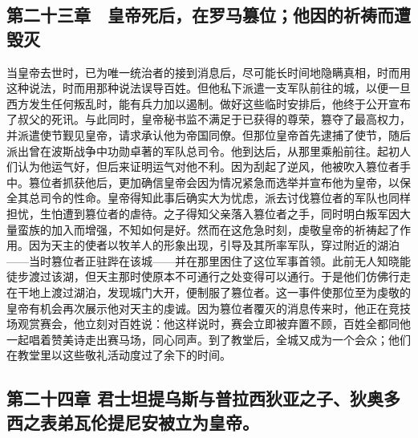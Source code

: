 
\subsection{第二十三章　皇帝死后，在罗马篡位；他因的祈祷而遭毁灭}

当皇帝去世时，已为唯一统治者的接到消息后，尽可能长时间地隐瞒真相，时而用这种说法，时而用那种说法误导百姓。但他私下派遣一支军队前往的城，以便一旦西方发生任何叛乱时，能有兵力加以遏制。做好这些临时安排后，他终于公开宣布了叔父的死讯。与此同时，皇帝秘书监不满足于已获得的尊荣，篡夺了最高权力，并派遣使节觐见皇帝，请求承认他为帝国同僚。但那位皇帝首先逮捕了使节，随后派出曾在波斯战争中功勋卓著的军队总司令。他到达后，从那里乘船前往。起初人们认为他运气好，但后来证明运气对他不利。因为刮起了逆风，他被吹入篡位者手中。篡位者抓获他后，更加确信皇帝会因为情况紧急而选举并宣布他为皇帝，以保全其总司令的性命。皇帝得知此事后确实大为忧虑，派去讨伐篡位者的军队也同样担忧，生怕遭到篡位者的虐待。之子得知父亲落入篡位者之手，同时明白叛军因大量蛮族的加入而增强，不知如何是好。然而在这危急时刻，虔敬皇帝的祈祷起了作用。因为天主的使者以牧羊人的形象出现，引导及其所率军队，穿过附近的湖泊——当时篡位者正驻跸在该城——并在那里困住了这位军事首领。此前无人知晓能徒步渡过该湖，但天主那时使原本不可通行之处变得可以通行。于是他们仿佛行走在干地上渡过湖泊，发现城门大开，便制服了篡位者。这一事件使那位至为虔敬的皇帝有机会再次展示他对天主的虔诚。因为篡位者覆灭的消息传来时，他正在竞技场观赏赛会，他立刻对百姓说：他这样说时，赛会立即被弃置不顾，百姓全都同他一起唱着赞美诗走出赛马场，同心同声。到了教堂后，全城又成为一个会众；他们在教堂里以这些敬礼活动度过了余下的时间。\par


\subsection{第二十四章 君士坦提乌斯与普拉西狄亚之子、狄奥多西之表弟瓦伦提尼安被立为皇帝。}

